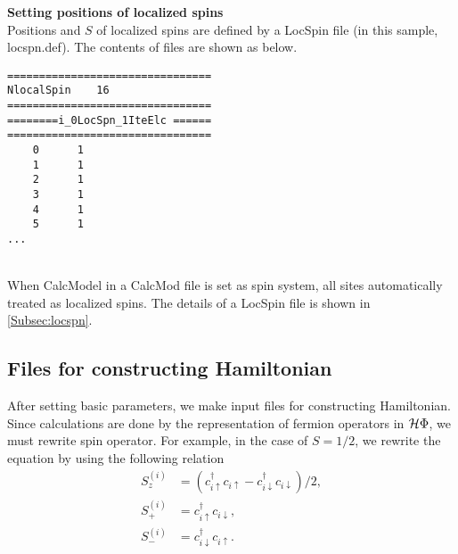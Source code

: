 \begin{description}
\item {\bf Setting positions of localized spins}\\
Positions {and $S$} of localized spins are defined by a LocSpin file (in this sample, locspn.def). The contents of files are shown as below.\\
\begin{minipage}{15cm}
\begin{screen}
\begin{verbatim}
================================ 
NlocalSpin    16  
================================ 
========i_0LocSpn_1IteElc ====== 
================================ 
    0      1
    1      1
    2      1
    3      1
    4      1
    5      1
...
\end{verbatim}
\end{screen}
\end{minipage}
~\\
When CalcModel in a CalcMod file is set as spin system, all sites automatically treated as localized spins. The details of a LocSpin file is shown in \ref{Subsec:locspn}.
\end{description}

\subsection{Files for constructing Hamiltonian}
After setting basic parameters, we make input files for constructing Hamiltonian. Since calculations are done by the representation of fermion operators in $\mathcal{H} \Phi$, we must rewrite spin operator. {For example,  in the case of $S=1/2$, we rewrite the equation by} using the following relation
\begin{align}
S_z^{(i)}&=(c_{i\uparrow}^{\dag}c_{i\uparrow}-c_{i\downarrow}^{\dag}c_{i\downarrow})/2,\\
S_+^{(i)}&=c_{i\uparrow}^{\dag}c_{i\downarrow},\\
S_-^{(i)}&=c_{i\downarrow}^{\dag}c_{i\uparrow}.
\end{align}

